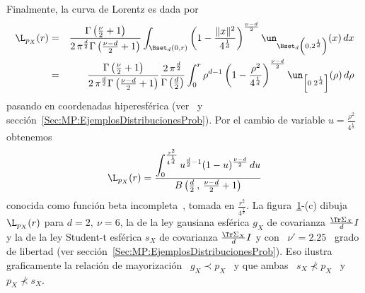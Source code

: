 {\begin{ejemplo}
 Finalmente, la curva de Lorentz es dada por
  \begin{eqnarray*}
  \L_{p_X}(r) & = & \frac{\Gamma\left( \frac{\nu}{2} + 1 \right)}{2 \,
  \pi^{\frac{d}{2}} \Gamma\left( \frac{\nu-d}{2} + 1 \right)} \int_{\Bset_d(0,r)}
  \left( 1 - \frac{\|x\|^2}{4^{\frac1d}} \right)^{\frac{\nu-d}{2}}
  \un_{\Bset_d\left(0 , 2^{\frac1d} \right)}(x) \, dx\\
  & = & \frac{\Gamma\left( \frac{\nu}{2} + 1 \right)}{2 \, \pi^{\frac{d}{2}}
  \Gamma\left( \frac{\nu-d}{2} + 1 \right)} \frac{2 \,
  \pi^{\frac{d}{2}}}{\Gamma\left( \frac{d}{2} \right)} \int_0^r \rho^{d-1} \left( 1 -
  \frac{\rho^2}{4^{\frac1d}} \right)^{\frac{\nu-d}{2}} \un_{\left[ 0 \; 2^{\frac1d}
  \right]}(\rho) \, d\rho
  \end{eqnarray*}
  pasando en coordenadas hiperesf\'erica (ver~\cite{Lor54, FanKot90, CamHua81} y
  secci\'on~\ref{Sec:MP:EjemplosDistribucionesProb}). Por  el cambio de variable
  $u = \frac{\rho^2}{4^{\frac1d}}$ obtenemos
  \[
  \L_{p_X}(r)     =     \frac{\displaystyle     \int_0^{\frac{r^2}{4^{\frac1d}}}
    u^{\frac{d}{2}-1} (1-u)^{\frac{\nu-d}{2}} \, du}{B\left( \frac{d}{2} \, , \,
      \frac{\nu-d}{2} + 1 \right)}
  \]
  conocida como funci\'on  beta incompleta~\cite[Ec.~8.392]{GraRyz15}, tomada en
  $\frac{r^2}{4^{\frac1d}}$.                                                   La
  figura~\ref{Fig:MP:RearregloMayorizacionEjemplo}-(c) dibuja $\L_{p_X}(r)$ para
  $d =  2, \: \nu  = 6$, la  de la ley  gausiana esf\'erica $g_X$  de covarianza
  $\frac{\Tr  \Sigma_X}{d} I$  y  la de  la  ley Student-t  esf\'erica $s_X$  de
  covarianza  $\frac{\Tr \Sigma_X}{d}  I$  y con  \  $\nu' =  2.25$  \ grado  de
  libertad (ver  secci\'on~\ref{Sec:MP:EjemplosDistribucionesProb}). Eso ilustra
  graficamente la relaci\'on de mayorizaci\'on \ $g_X \prec p_X$ \ y que ambas \
  $s_X \not\prec p_X$ \ y \ $p_X \not\prec s_X$.

  \begin{figure}[h!]
  \begin{center}  \end{center}
  \label{Fig:MP:RearregloMayorizacionEjemplo}
  \end{figure}
\end{ejemplo}
}
